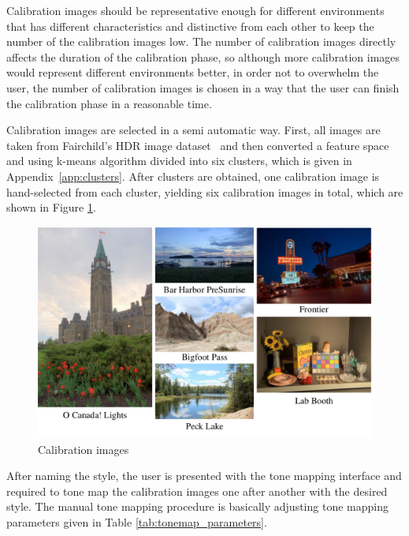 Calibration images should be representative enough for different environments that has different characteristics and distinctive from each other to keep the number of the calibration images low. The number of calibration images directly affects the duration of the calibration phase, so although more calibration images would represent different environments better, in order not to overwhelm the user, the number of calibration images is chosen in a way that the user can finish the calibration phase in a reasonable time.

Calibration images are selected in a semi automatic way. First, all images are taken from Fairchild's HDR image dataset~\cite{fairchild2007hdr} and then converted a feature space and using k-means algorithm divided into six clusters, which is given in Appendix~\ref{app:clusters}. After clusters are obtained, one calibration image is hand-selected from each cluster, yielding six calibration images in total, which are shown in Figure \ref{fig:calibration_images}.

\begin{figure}
\begin{center}
\includegraphics[width=\textwidth]{figures/chapter5/temp_calibration_images.png}
\caption{Calibration images
}
\label{fig:calibration_images}
\end{center}
\end{figure}

After naming the style, the user is presented with the tone mapping interface and required to tone map the calibration images one after another with the desired style. The manual tone mapping procedure is basically adjusting tone mapping parameters given in Table \ref{tab:tonemap_parameters}.

